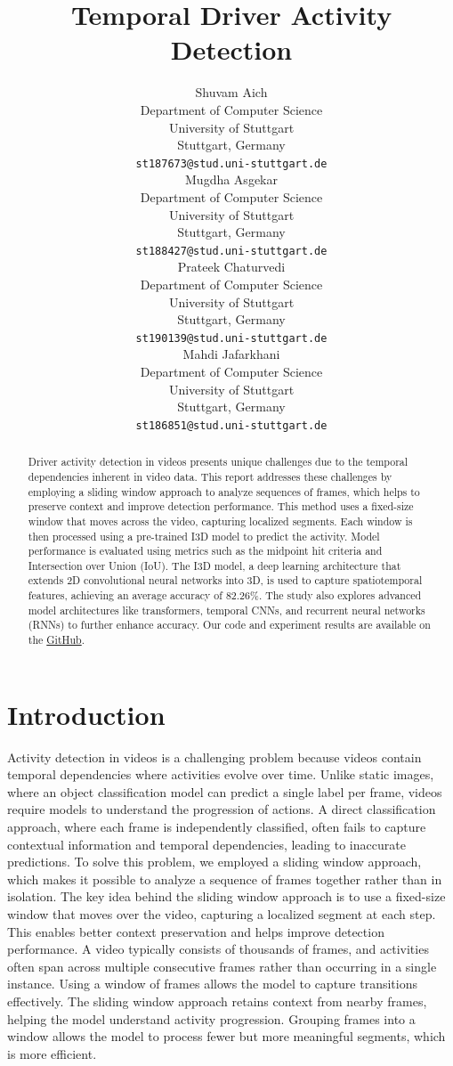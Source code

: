 \documentclass{article}
\title{Temporal Driver Activity Detection}
\author{%
  Shuvam Aich \\
  Department of Computer Science\\
  University of Stuttgart\\
  Stuttgart, Germany \\
  \texttt{st187673@stud.uni-stuttgart.de} \\
  \And
  Mugdha Asgekar \\
  Department of Computer Science\\
  University of Stuttgart\\
  Stuttgart, Germany \\
  \texttt{st188427@stud.uni-stuttgart.de} \\
  \AND
  Prateek Chaturvedi \\
  Department of Computer Science\\
  University of Stuttgart\\
  Stuttgart, Germany \\
  \texttt{st190139@stud.uni-stuttgart.de} \\
  \And
  Mahdi Jafarkhani \\
  Department of Computer Science\\
  University of Stuttgart\\
  Stuttgart, Germany \\
  \texttt{st186851@stud.uni-stuttgart.de} \\
}
\begin{document}
\maketitle


\begin{abstract}
Driver activity detection in videos presents unique challenges due to the temporal dependencies inherent in video data. This report addresses these challenges by employing a sliding window approach to analyze sequences of frames, which helps to preserve context and improve detection performance. This method uses a fixed-size window that moves across the video, capturing localized segments. Each window is then processed using a pre-trained I3D model to predict the activity. Model performance is evaluated using metrics such as the midpoint hit criteria and Intersection over Union (IoU). The I3D model, a deep learning architecture that extends 2D convolutional neural networks into 3D, is used to capture spatiotemporal features, achieving an average accuracy of 82.26\%. The study also explores advanced model architectures like transformers, temporal CNNs, and recurrent neural networks (RNNs) to further enhance accuracy. Our code and experiment results are available on
the \href{https://github.com/M-Jafarkhani/DriveAndActInferenceDemo}{GitHub}.
\end{abstract}


\section{Introduction}

Activity detection in videos is a challenging problem because videos contain temporal dependencies where activities evolve over time. Unlike static images, where an object classification model can predict a single label per frame, videos require models to understand the progression of actions. A direct classification approach, where each frame is independently classified, often fails to capture contextual information and temporal dependencies, leading to inaccurate predictions. To solve this problem, we employed a sliding window approach, which makes it possible to analyze a sequence of frames together rather than in isolation. The key idea behind the sliding window approach is to use a fixed-size window that moves over the video, capturing a localized segment at each step. This enables better context preservation and helps improve detection performance. A video typically consists of thousands of frames, and activities often span across multiple consecutive frames rather than occurring in a single instance. Using a window of frames allows the model to capture transitions effectively. The sliding window approach retains context from nearby frames, helping the model understand activity progression. Grouping frames into a window allows the model to process fewer but more meaningful segments, which is more efficient.
\end{document}
